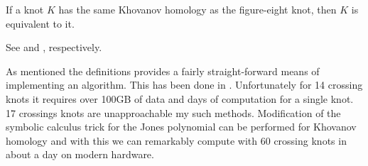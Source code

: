     \begin{theorem}
        If a knot $K$ has the same Khovanov homology as the figure-eight
        knot, then $K$ is equivalent to it.
    \end{theorem}
    See \cite{BaldwinSivekKhovanovTrefoils} and
    \cite{BaldwinDowlinKhovanovFigureEight}, respectively.
    \par\hfill\par
    As mentioned the definitions provides a fairly straight-forward means of
    implementing an algorithm. This has been done in
    \cite{sage}. Unfortunately for 14 crossing knots it requires over
    100GB of data and days of computation for a single knot. 17 crossings
    knots are unapproachable my such methods. Modification of the
    symbolic calculus trick for the Jones polynomial can be performed for
    Khovanov homology \cite{BarNatan2006FASTKH} and with this we can
    remarkably compute with 60 crossing knots in about a day on modern hardware.
